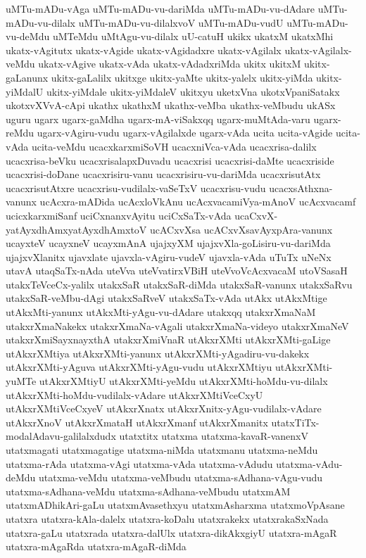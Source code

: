 {uMTu-mADu-vAga
uMTu-mADu-vu-dariMda
uMTu-mADu-vu-dAdare
uMTu-mADu-vu-dilalx
uMTu-mADu-vu-dilalxvoV
uMTu-mADu-vudU
uMTu-mADu-vu-deMdu
uMTeMdu
uMtAgu-vu-dilalx
uU-catuH
ukikx
ukatxM
ukatxMhi
ukatx-vAgitutx
ukatx-vAgide
ukatx-vAgidadxre
ukatx-vAgilalx
ukatx-vAgilalx-veMdu
ukatx-vAgive
ukatx-vAda
ukatx-vAdadxriMda
ukitx
ukitxM
ukitx-gaLanunx
ukitx-gaLalilx
ukitxge
ukitx-yaMte
ukitx-yalelx
ukitx-yiMda
ukitx-yiMdalU
ukitx-yiMdale
ukitx-yiMdaleV
ukitxyu
uketxVna
ukotxVpaniSatakx
ukotxvXVvA-cApi
ukathx
ukathxM
ukathx-veMba
ukathx-veMbudu
ukASx
uguru
ugarx
ugarx-gaMdha
ugarx-mA-viSakxqq
ugarx-muMtAda-varu
ugarx-reMdu
ugarx-vAgiru-vudu
ugarx-vAgilalxde
ugarx-vAda
ucita
ucita-vAgide
ucita-vAda
ucita-veMdu
ucacxkarxmiSoVH
ucacxniVca-vAda
ucacxrisa-dalilx
ucacxrisa-beVku
ucacxrisalapxDuvadu
ucacxrisi
ucacxrisi-daMte
ucacxriside
ucacxrisi-doDane
ucacxrisiru-vanu
ucacxrisiru-vu-dariMda
ucacxrisutAtx
ucacxrisutAtxre
ucacxrisu-vudilalx-vaSeTxV
ucacxrisu-vudu
ucacxsAthxna-vanunx
ucAcxra-mADida
ucAcxloVkAnu
ucAcxvacamiVya-mAnoV
ucAcxvacamf
ucicxkarxmiSanf
uciCxnanxvAyitu
uciCxSaTx-vAda
ucaCxvX-yatAyxdhAmxyatAyxdhAmxtoV
ucACxvXsa
ucACxvXsavAyxpAra-vanunx
ucayxteV
ucayxneV
ucayxmAnA
ujajxyXM
ujajxvXla-goLisiru-vu-dariMda
ujajxvXlanitx
ujavxlate
ujavxla-vAgiru-vudeV
ujavxla-vAda
uTuTx
uNeNx
utavA
utaqSaTx-nAda
uteVva
uteVvatirxVBiH
uteVvoVcAcxvacaM
utoVSasaH
utakxTeVceCx-yalilx
utakxSaR
utakxSaR-diMda
utakxSaR-vanunx
utakxSaRvu
utakxSaR-veMbu-dAgi
utakxSaRveV
utakxSaTx-vAda
utAkx
utAkxMtige
utAkxMti-yanunx
utAkxMti-yAgu-vu-dAdare
utakxqq
utakxrXmaNaM
utakxrXmaNakekx
utakxrXmaNa-vAgali
utakxrXmaNa-videyo
utakxrXmaNeV
utakxrXmiSayxnayxthA
utakxrXmiVnaR
utAkxrXMti
utAkxrXMti-gaLige
utAkxrXMtiya
utAkxrXMti-yanunx
utAkxrXMti-yAgadiru-vu-dakekx
utAkxrXMti-yAguva
utAkxrXMti-yAgu-vudu
utAkxrXMtiyu
utAkxrXMti-yuMTe
utAkxrXMtiyU
utAkxrXMti-yeMdu
utAkxrXMti-hoMdu-vu-dilalx
utAkxrXMti-hoMdu-vudilalx-vAdare
utAkxrXMtiVceCxyU
utAkxrXMtiVceCxyeV
utAkxrXnatx
utAkxrXnitx-yAgu-vudilalx-vAdare
utAkxrXnoV
utAkxrXmataH
utAkxrXmanf
utAkxrXmanitx
utatxTiTx-modalAdavu-galilalxdudx
utatxtitx
utatxma
utatxma-kavaR-vanenxV
utatxmagati
utatxmagatige
utatxma-niMda
utatxmanu
utatxma-neMdu
utatxma-rAda
utatxma-vAgi
utatxma-vAda
utatxma-vAdudu
utatxma-vAdu-deMdu
utatxma-veMdu
utatxma-veMbudu
utatxma-sAdhana-vAgu-vudu
utatxma-sAdhana-veMdu
utatxma-sAdhana-veMbudu
utatxmAM
utatxmADhikAri-gaLu
utatxmAvasethxyu
utatxmAsharxma
utatxmoVpAsane
utatxra
utatxra-kAla-dalelx
utatxra-koDalu
utatxrakekx
utatxrakaSxNada
utatxra-gaLu
utatxrada
utatxra-dalUlx
utatxra-dikAkxgiyU
utatxra-mAgaR
utatxra-mAgaRda
utatxra-mAgaR-diMda
}
